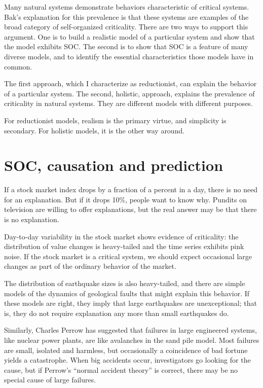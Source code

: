 \documentclass[12pt]{book}
\theoremstyle{exercise}
\begin{document}

Many natural systems demonstrate behaviors characteristic of critical
systems.  Bak's explanation for this prevalence is that these systems
are examples of the broad category of self-organized criticality.
There are two ways to support this argument.  One is to build
a realistic model of a particular system and show that the model
exhibits SOC.  The second is to show that SOC is a feature of many
diverse models, and to identify the essential characteristics
those models have in common.

The first approach, which I characterize as reductionist, can explain
the behavior of a particular system.  The second, holistic, approach,
explains the prevalence of criticality in natural systems.  They are
different models with different purposes.


For reductionist models, realism is the primary virtue, and simplicity
is secondary.  For holistic models, it is the other way around.


\section{SOC, causation and prediction}

If a stock market index drops by a fraction of a percent in a
day, there is no need for an explanation.  But if it drops 10\%,
people want to know why.  Pundits
on television are willing to offer explanations, but the real
answer may be that there is no explanation.


Day-to-day variability in the stock market shows evidence of
criticality: the distribution of value changes is heavy-tailed
and the time series exhibits pink noise.
If the stock market is a critical system, we
should expect occasional large changes as part of the ordinary
behavior of the market.

The distribution of earthquake sizes is also heavy-tailed,
and there are simple models of the dynamics of geological faults
that might explain this behavior.  If these models are right,
they imply that large earthquakes are unexceptional; that is,
they do not require explanation any more than
small earthquakes do.


Similarly, Charles Perrow has suggested that failures in large
engineered systems, like nuclear power plants, are like avalanches
in the sand pile model.  Most failures are small, isolated and
harmless, but occasionally a coincidence of bad fortune yields a
catastrophe.  When big accidents occur, investigators go looking for
the cause, but if Perrow's ``normal accident theory'' is correct,
there may be no special cause of large failures.
\end{document}
